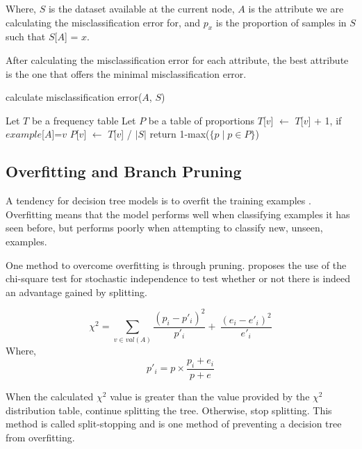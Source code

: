 \documentclass{IEEEtran}
\begin{document}
Where, $S$ is the dataset available at the current node, $A$ is the
attribute we are calculating the misclassification error for, and $p_x$
is the proportion of samples in $S$ such that $S$[$A$] = $x$.

After calculating the misclassification error for each attribute, the
best attribute is the one that offers the minimal misclassification
error.

\begin{algorithm}
\caption{calculate misclassification error($A$, $S$)}
\begin{algorithmic}
\Statex {}
\State Let $T$ be a frequency table
\State Let $P$ be a table of proportions
    \State $T$[$v$] $\leftarrow$ $T$[$v$] + 1, if $example$[$A$]=$v$
  \EndFor
  \State $P$[$v$] $\leftarrow$ $T$[$v$] / $\lvert S \rvert$
\EndFor
\State return 1-max($\lbrace p \mid p \in P\rbrace$)

\end{algorithmic}
\end{algorithm}

\subsection{Overfitting and Branch Pruning}
A tendency for decision tree models is to overfit the training
examples \parencite{mitchell1997machine}. Overfitting means that the
model performs well when classifying examples it has seen before, but
performs poorly when attempting to classify new, unseen, examples.

One method to overcome overfitting is through
pruning. \parencite{quinlan1986induction} proposes the use of the
chi-square test for stochastic independence to test whether or not
there is indeed an advantage gained by splitting.

\begin{equation}
\label{chi-square-equation}
\chi^2 = \sum_{v\in val(A)}\frac{(p_i-p'_i)^2}{p'_i} + \
\frac{(e_i-e'_i)^2}{e'_i}
\end{equation}
Where,
\begin{equation}
\label{chi-square-helper-equation}
p'_i = p \times \frac{p_i+e_i}{p+e}
\end{equation}

When the calculated $\chi^2$ value is greater than the value provided by
the $\chi^2$ distribution table, continue splitting the tree. Otherwise,
stop splitting. This method is called split-stopping and is one method
of preventing a decision tree from overfitting.
\end{document}
